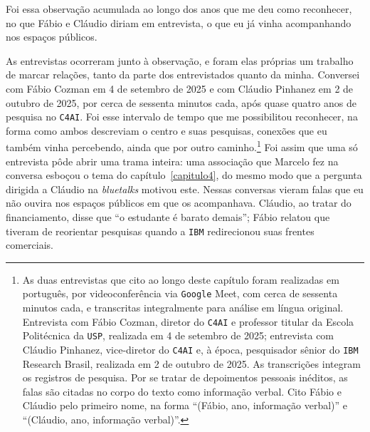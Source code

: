 Foi essa observação acumulada ao longo dos anos que me deu como reconhecer, no que Fábio e Cláudio diriam em entrevista, o que eu já vinha acompanhando nos espaços públicos.

As entrevistas ocorreram junto à observação, e foram elas próprias um trabalho de marcar relações, tanto da parte dos entrevistados quanto da minha. Conversei com Fábio Cozman em 4 de setembro de 2025 e com Cláudio Pinhanez em 2 de outubro de 2025, por cerca de sessenta minutos cada, após quase quatro anos de pesquisa no \texttt{C4AI}. Foi esse intervalo de tempo que me possibilitou reconhecer, na forma como ambos descreviam o centro e suas pesquisas, conexões que eu também vinha percebendo, ainda que por outro caminho.\footnote{As duas entrevistas que cito ao longo deste capítulo foram realizadas em português, por videoconferência via \texttt{Google} Meet, com cerca de sessenta minutos cada, e transcritas integralmente para análise em língua original. Entrevista com Fábio Cozman, diretor do \texttt{C4AI} e professor titular da Escola Politécnica da \texttt{USP}, realizada em 4 de setembro de 2025; entrevista com Cláudio Pinhanez, vice-diretor do \texttt{C4AI} e, à época, pesquisador sênior do \texttt{IBM} Research Brasil, realizada em 2 de outubro de 2025. As transcrições integram os registros de pesquisa. Por se tratar de depoimentos pessoais inéditos, as falas são citadas no corpo do texto como informação verbal. Cito Fábio e Cláudio pelo primeiro nome, na forma \enquote{(Fábio, ano, informação verbal)} e \enquote{(Cláudio, ano, informação verbal)}.} Foi assim que uma só entrevista pôde abrir uma trama inteira: uma associação que Marcelo fez na conversa esboçou o tema do capítulo~\ref{capitulo4}, do mesmo modo que a pergunta dirigida a Cláudio na \textit{bluetalks} motivou este. Nessas conversas vieram falas que eu não ouvira nos espaços públicos em que os acompanhava. Cláudio, ao tratar do financiamento, disse que \enquote{o estudante é barato demais}; Fábio relatou que tiveram de reorientar pesquisas quando a \texttt{IBM} redirecionou suas frentes comerciais. 

